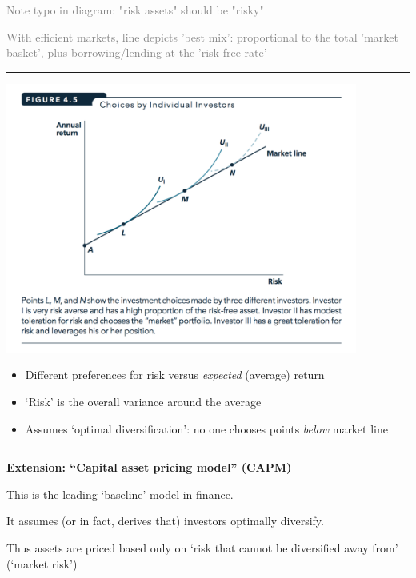 \documentclass[]{article}
\providecommand{\tightlist}{%
  \setlength{\itemsep}{0pt}\setlength{\parskip}{0pt}}
\begin{document}
\textcolor{gray}{Note typo in diagram: "risk assets" should be "risky"}

\textcolor{gray}{With efficient markets, line depicts 'best mix': proportional to the total 'market basket', plus borrowing/lending at the 'risk-free rate'}

\begin{center}\rule{0.5\linewidth}{\linethickness}\end{center}

\includegraphics[height=3.5in]{picsfigs/investorchoices.png}

\begin{itemize}
\tightlist
\item
  Different preferences for risk versus \emph{expected} (average) return
\item
  `Risk' is the overall variance around the average
\item
  Assumes `optimal diversification': no one chooses points \emph{below} market line
\end{itemize}

\begin{center}\rule{0.5\linewidth}{\linethickness}\end{center}

\textbf{Extension: ``Capital asset pricing model'' (CAPM)}

This is the leading `baseline' model in finance.

It assumes (or in fact, derives that) investors optimally diversify.

\bigskip

Thus assets are priced based only on `risk that cannot be diversified away from' (`market risk')
\end{document}
